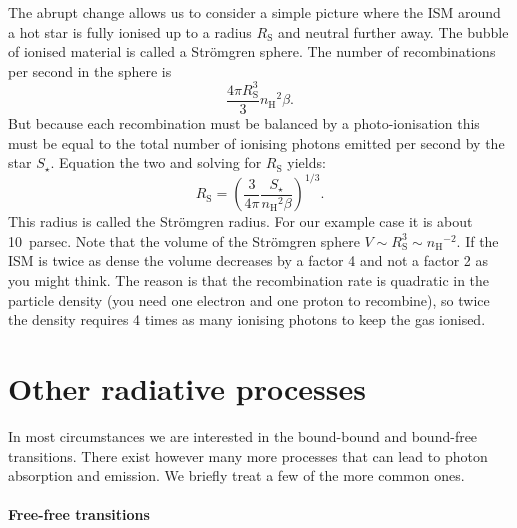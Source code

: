 \documentclass[12pt]{article}
\numberwithin{equation}{section}
\newcommand{\be}{\begin{equation}}
\newcommand{\ee}{\end{equation}}
\def\nH{\ensuremath{n_\mathrm{H}}}
\begin{document}
The abrupt change allows us to consider a simple picture where the ISM around a hot star is fully ionised up to a radius $R_\mathrm{S}$ and neutral further away. The bubble of ionised material is called a Str\"omgren sphere. The number of recombinations per second in the sphere is 
\be
\frac{4 \pi R_\mathrm{S}^3}{3} \nH^2 \beta.
\ee
But because  each recombination must be balanced by a photo-ionisation this must be equal to the total number of ionising photons emitted per second by the star $S_\star$. Equation the two and solving for $R_\mathrm{S}$ yields:
\be
R_\mathrm{S} = \left( \frac{3}{4\pi} \frac{S_\star}{\nH^2 \beta} \right)^{1/3}.
\ee
This radius is called the Str\"omgren radius. For our example case it is about 10~parsec. Note that the volume of the Str\"omgren sphere $V \sim R_\mathrm{S}^3 \sim \nH^{-2}$. If the ISM is twice as dense the volume decreases by a factor 4 and not a factor 2 as you might think. The reason is that the recombination rate is quadratic in the particle density (you need one electron and one proton to recombine), so twice the density requires 4 times as many ionising photons to keep the gas ionised.

\section{Other radiative processes}
In most circumstances we are interested in the bound-bound and bound-free transitions. There exist however many more processes that can lead to photon absorption and emission. We briefly treat a few of the more common ones.

\paragraph{Free-free transitions}
\end{document}

